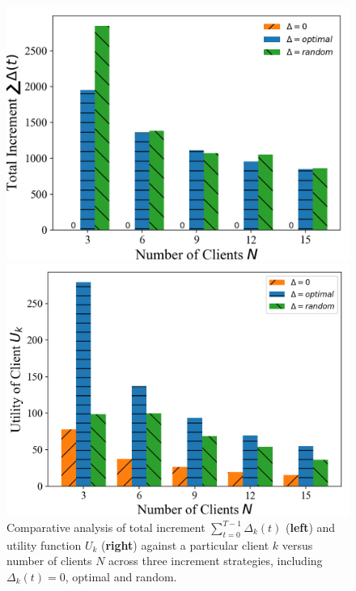 \documentclass{article}
\theoremstyle{plain}
\theoremstyle{definition}
\theoremstyle{remark}
\begin{document}
\begin{figure}
	\begin{minipage}{0.49\linewidth}
		\centerline{\includegraphics[width=\textwidth]{figures/figure_60_A.png}}
	\end{minipage}
	\begin{minipage}{0.49\linewidth}
		\centerline{\includegraphics[width=\textwidth]{figures/figure_60_B.png}}
	\end{minipage}
	\caption{Comparative analysis of total increment $\sum_{t=0}^{T-1} \Delta_k(t)$ (\textbf{left}) and utility function $U_k$ (\textbf{right}) against a particular client $k$ versus number of clients $N$ across three increment strategies, including $\Delta_k(t) = 0$, optimal and random.}
    \label{fig:clients}
\end{figure}
\end{document}

